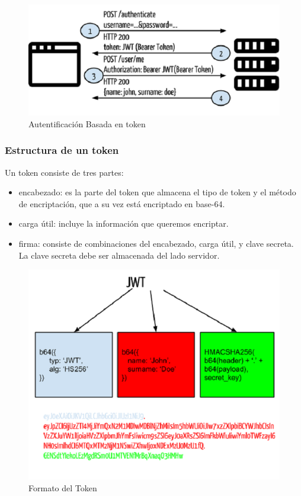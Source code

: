 \begin{figure}[H]
	\centering\includegraphics[scale=0.7]{imagenes/token.png}
	\caption{Autentificación Basada en token}
	\label{token}
\end{figure}

\newpage

\subsubsection{Estructura de un token}

Un token consiste de tres partes:
\begin{itemize}
	\item encabezado: es la parte del token que almacena el tipo de token y el método de encriptación, que a su vez está encriptado en base-64.
	\item carga útil: incluye la información que queremos encriptar.
	\item firma: consiste de combinaciones del encabezado, carga útil, y clave secreta. La clave secreta debe ser almacenada del lado servidor.
\end{itemize}

\begin{figure}[H]
	\centering\includegraphics[scale=0.5]{imagenes/jwt.png}
	\caption{Formato del Token}
	\label{formatoToken}
\end{figure}

